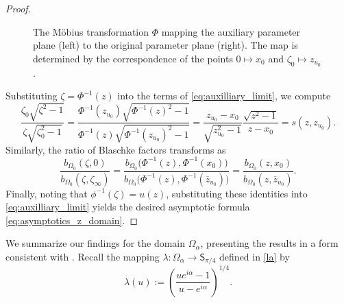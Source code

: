 \documentclass[12pt,oneside,reqno]{amsart}
\theoremstyle{definition}
\numberwithin{equation}{section}
\begin{document}
\begin{proof}
\begin{figure}[h]
\begin{center}
\end{center}

\caption{The Möbius transformation $\Phi$ mapping the auxiliary parameter plane (left) to the original parameter plane (right). The map is determined by the correspondence of the points $0 \mapsto x_0$ and $\zeta_0 \mapsto z_{u_0}$.}
\label{fig:conformal_maps_2}
\end{figure}

Substituting $\zeta = \Phi^{-1}(z)$ into the terms of \eqref{eq:auxilliary_limit}, we compute
\begin{equation}
    \frac{\zeta_0 \sqrt{\zeta^2-1}}{\zeta \sqrt{\zeta_0^2-1}}
    = \frac{\Phi^{-1}(z_{u_0})\sqrt{\Phi^{-1}(z)^2-1}}{\Phi^{-1}(z)\sqrt{\Phi^{-1}(z_{u_0})^2-1}}
    = \frac{z_{u_0}-x_0}{\sqrt{z_{u_0}^2-1}}\frac{\sqrt{z^2-1}}{z-x_0}
    = s(z, z_{u_0}).
\end{equation}
Similarly, the ratio of Blaschke factors transforms as
\begin{equation}
    \frac{b_{\Omega_0}(\zeta,0)}{b_{\Omega_0}(\zeta,\zeta_\infty)}
    = \frac{b_{\Omega_0}\bigl(\Phi^{-1}(z), \Phi^{-1}(x_0)\bigr)}{b_{\Omega_0}\bigl(\Phi^{-1}(z),\Phi^{-1}(\overline {z}_{u_0})\bigr)}
    = \frac{b_{\Omega_0}(z,x_0)}{b_{\Omega_0}(z,\overline{z}_{u_0})}.
\end{equation}
Finally, noting that $\phi^{-1}(\zeta) = u(z)$, substituting these identities into \eqref{eq:auxilliary_limit} yields the desired asymptotic formula \eqref{eq:asymptotics_z_domain}.
\end{proof}




We summarize our findings for the domain $\Omega_\alpha$, presenting the results in a form consistent with \cite{eichinger17}. Recall the mapping \(\lambda : \Omega_\alpha \to \mathsf{S}_{\pi/4}\) defined in \eqref{la} by 
\begin{equation}
	\lambda(u) := \left(\frac{ue^{i\alpha}-1}{u-e^{i\alpha}}\right)^{1/4}.
	\label{eq:lambda}
\end{equation}
\end{document}
